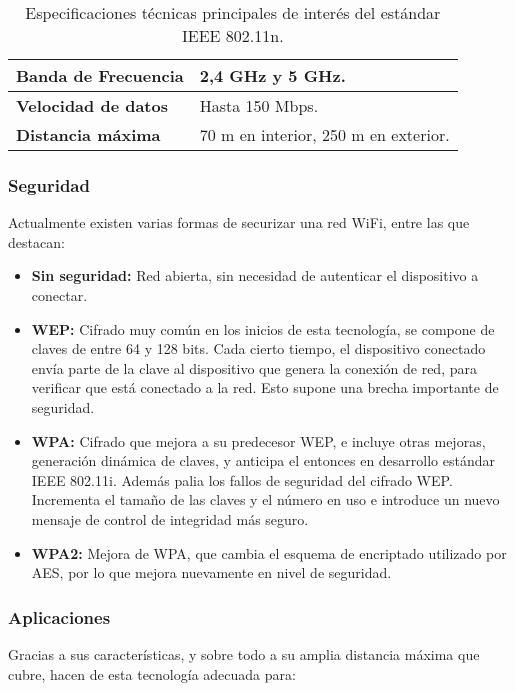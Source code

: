         \begin{table}[!ht]
            \centering
            {
            \begin{tabularx}{\textwidth}{|l|X|}
                \hline
                \textbf{Banda de Frecuencia} & 2,4 GHz y 5 GHz. \\ \hline
                \textbf{Velocidad de datos} & Hasta 150 Mbps. \\ \hline
                \textbf{Distancia máxima} & 70 m en interior, 250 m en exterior. \\ \hline
            \end{tabularx}
            }
            \caption{Especificaciones técnicas principales de interés del estándar IEEE 802.11n.}
            \label{tab:80211n}
        \end{table}

        \subsubsection{Seguridad}
        Actualmente existen varias formas de securizar una red WiFi, entre las que destacan:

        \begin{itemize}
            \item \textbf{Sin seguridad:} Red abierta, sin necesidad de autenticar el dispositivo a conectar.
            \item \textbf{WEP:} Cifrado muy común en los inicios de esta tecnología, se compone de claves de entre 64 y 128 bits. Cada cierto tiempo, el dispositivo conectado envía parte de la clave al dispositivo que genera la conexión de red, para verificar que está conectado a la red. Esto supone una brecha importante de seguridad.
            \item \textbf{WPA:} Cifrado que mejora a su predecesor WEP, e incluye otras mejoras, generación dinámica de claves, y anticipa el entonces en desarrollo estándar IEEE 802.11i. Además palia los fallos de seguridad del cifrado WEP. Incrementa el tamaño de las claves y el número en uso e introduce un nuevo mensaje de control de integridad más seguro.
            \item \textbf{WPA2:} Mejora de WPA, que cambia el esquema de encriptado utilizado por AES, por lo que mejora nuevamente en nivel de seguridad.
        \end{itemize}

        \subsubsection{Aplicaciones}
        Gracias a sus características, y sobre todo a su amplia distancia máxima que cubre, hacen de esta tecnología adecuada para:

